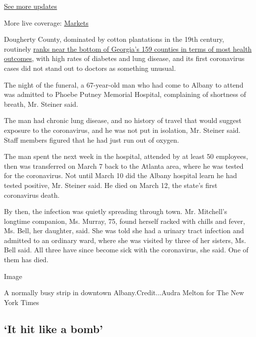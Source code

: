 \href{https://www.nytimes.com/2020/08/01/world/coronavirus-covid-19.html?action=click\&pgtype=Article\&state=default\&region=MAIN_CONTENT_1\&context=storylines_live_updates}{See
more updates}

More live coverage:
\href{https://www.nytimes.com/live/2020/07/31/business/stock-market-today-coronavirus?action=click\&pgtype=Article\&state=default\&region=MAIN_CONTENT_1\&context=storylines_live_updates}{Markets}

Dougherty County, dominated by cotton plantations in the 19th century,
routinely
\href{https://www.countyhealthrankings.org/sites/default/files/media/document/CHR2020_GA_v2.pdf}{ranks
near the bottom of Georgia's 159 counties in terms of most health
outcomes}, with high rates of diabetes and lung disease, and its first
coronavirus cases did not stand out to doctors as something unusual.

The night of the funeral, a 67-year-old man who had come to Albany to
attend was admitted to Phoebe Putney Memorial Hospital, complaining of
shortness of breath, Mr. Steiner said.

The man had chronic lung disease, and no history of travel that would
suggest exposure to the coronavirus, and he was not put in isolation,
Mr. Steiner said. Staff members figured that he had just run out of
oxygen.

The man spent the next week in the hospital, attended by at least 50
employees, then was transferred on March 7 back to the Atlanta area,
where he was tested for the coronavirus. Not until March 10 did the
Albany hospital learn he had tested positive, Mr. Steiner said. He died
on March 12, the state's first coronavirus death.

By then, the infection was quietly spreading through town. Mr.
Mitchell's longtime companion, Ms. Murray, 75, found herself racked with
chills and fever, Ms. Bell, her daughter, said. She was told she had a
urinary tract infection and admitted to an ordinary ward, where she was
visited by three of her sisters, Ms. Bell said. All three have since
become sick with the coronavirus, she said. One of them has died.

Image

A normally busy strip in downtown Albany.Credit...Audra Melton for The
New York Times

\hypertarget{it-hit-like-a-bomb}{%
\subsection{`It hit like a bomb'}\label{it-hit-like-a-bomb}}

